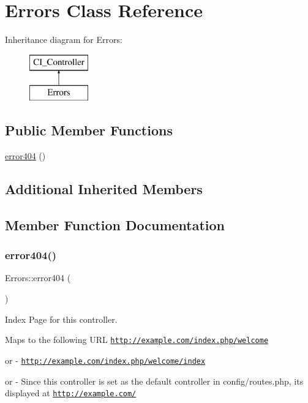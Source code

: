 \hypertarget{class_errors}{}\section{Errors Class Reference}
\label{class_errors}
Inheritance diagram for Errors\+:\begin{figure}[H]
\begin{center}
\leavevmode
\includegraphics[height=2.000000cm]{class_errors}
\end{center}
\end{figure}
\subsection*{Public Member Functions}
\begin{DoxyCompactItemize}
\item 
\mbox{\hyperlink{class_errors_a3060da01c11ea897cefc1cca9f1dd810}{error404}} ()
\end{DoxyCompactItemize}
\subsection*{Additional Inherited Members}


\subsection{Member Function Documentation}
\mbox{\label{class_errors_a3060da01c11ea897cefc1cca9f1dd810}} 
\subsubsection{\texorpdfstring{error404()}{error404()}}
{\footnotesize\ttfamily Errors\+::error404 (\begin{DoxyParamCaption}{ }\end{DoxyParamCaption})}

Index Page for this controller.

Maps to the following U\+RL \href{http://example.com/index.php/welcome}{\tt http\+://example.\+com/index.\+php/welcome}
\begin{DoxyItemize}
\item or -\/ \href{http://example.com/index.php/welcome/index}{\tt http\+://example.\+com/index.\+php/welcome/index}
\item or -\/ Since this controller is set as the default controller in config/routes.\+php, it\textquotesingle{}s displayed at \href{http://example.com/}{\tt http\+://example.\+com/}
\end{DoxyItemize}

